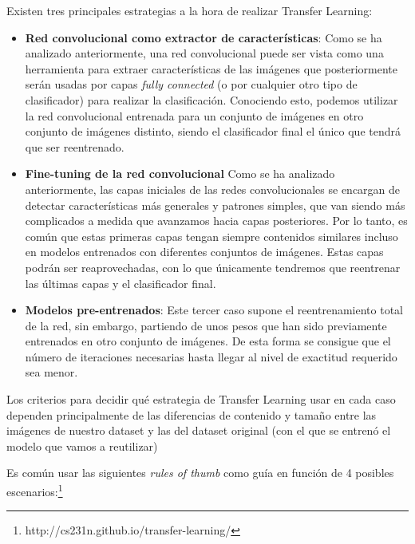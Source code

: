 \documentclass[
  12pt,
  spanish,
  a4paperpaper,
]{report}
\providecommand{\tightlist}{%
  \setlength{\itemsep}{0pt}\setlength{\parskip}{0pt}}
\begin{document}
Existen tres principales estrategias a la hora de realizar Transfer
Learning:

\begin{itemize}
\tightlist
\item
  \textbf{Red convolucional como extractor de características}: Como se
  ha analizado anteriormente, una red convolucional puede ser vista como
  una herramienta para extraer características de las imágenes que
  posteriormente serán usadas por capas \emph{fully connected} (o por
  cualquier otro tipo de clasificador) para realizar la clasificación.
  Conociendo esto, podemos utilizar la red convolucional entrenada para
  un conjunto de imágenes en otro conjunto de imágenes distinto, siendo
  el clasificador final el único que tendrá que ser reentrenado.
\item
  \textbf{Fine-tuning de la red convolucional} Como se ha analizado
  anteriormente, las capas iniciales de las redes convolucionales se
  encargan de detectar características más generales y patrones simples,
  que van siendo más complicados a medida que avanzamos hacia capas
  posteriores. Por lo tanto, es común que estas primeras capas tengan
  siempre contenidos similares incluso en modelos entrenados con
  diferentes conjuntos de imágenes. Estas capas podrán ser
  reaprovechadas, con lo que únicamente tendremos que reentrenar las
  últimas capas y el clasificador final.
\item
  \textbf{Modelos pre-entrenados}: Este tercer caso supone el
  reentrenamiento total de la red, sin embargo, partiendo de unos pesos
  que han sido previamente entrenados en otro conjunto de imágenes. De
  esta forma se consigue que el número de iteraciones necesarias hasta
  llegar al nivel de exactitud requerido sea menor.
\end{itemize}

Los criterios para decidir qué estrategia de Transfer Learning usar en
cada caso dependen principalmente de las diferencias de contenido y
tamaño entre las imágenes de nuestro dataset y las del dataset original
(con el que se entrenó el modelo que vamos a reutilizar)

Es común usar las siguientes \emph{rules of thumb} como guía en función
de 4 posibles escenarios:\footnote{http://cs231n.github.io/transfer-learning/}
\end{document}
